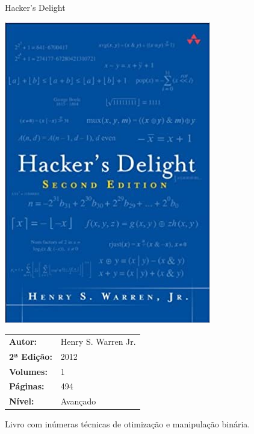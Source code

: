 \begin{frame}[fragile]{Hacker's Delight}

    \begin{minipage}{0.4\textwidth}
        \includegraphics[scale=0.25]{hackers.jpg}
    \end{minipage}
    \begin{minipage}{0.5\textwidth}
        \begin{small}
            \begin{tabularx}{0.95\textwidth}{lX}
                \textbf{Autor:} & Henry S. Warren Jr. \\
                \textbf{2ª Edição:} & 2012 \\
                \textbf{Volumes:} & 1 \\
                \textbf{Páginas:} & 494 \\
                \textbf{Nível:} & Avançado \\
            \end{tabularx}
        \end{small}
    \end{minipage}

    \vspace{0.2in} 

    Livro com inúmeras técnicas de otimização e manipulação binária.

\end{frame}

